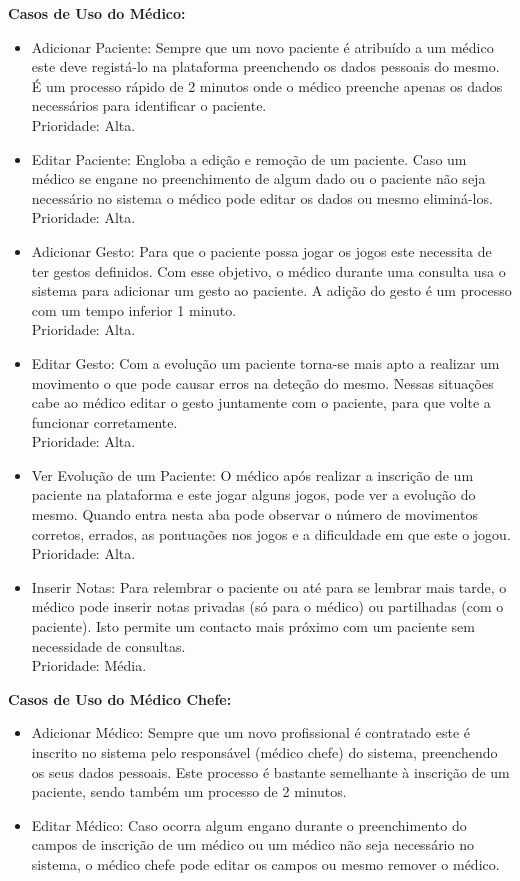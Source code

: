 \documentclass{TTUPhD}
\begin{document}
\textbf{Casos de Uso do Médico:}
\begin{itemize}
	\item Adicionar Paciente: Sempre que um novo paciente é atribuído a um médico este
		  deve registá-lo na plataforma preenchendo os dados pessoais do mesmo.
		  É um processo rápido de 2 minutos onde o médico preenche apenas os dados necessários para identificar o paciente.\\
          Prioridade: Alta.
	\item Editar Paciente: Engloba a edição e remoção de um paciente.
		  Caso um médico se engane no preenchimento de algum dado ou o paciente não seja necessário no sistema o médico pode editar os dados ou mesmo eliminá-los.\\
          Prioridade: Alta.
	\item Adicionar Gesto: Para que o paciente possa jogar os jogos este necessita de ter gestos definidos.
		  Com esse objetivo, o médico durante uma consulta usa o sistema para adicionar um gesto ao paciente.
		  A adição do gesto é um processo com um tempo inferior 1 minuto.\\
          Prioridade: Alta.
	\item Editar Gesto: Com a evolução um paciente torna-se mais apto a realizar um movimento o que pode causar erros na deteção do mesmo.
		  Nessas situações cabe ao médico editar o gesto juntamente com o paciente, para que volte a funcionar corretamente.\\
	      Prioridade: Alta.
	\item Ver Evolução de um Paciente: O médico após realizar a inscrição de um paciente na plataforma e este jogar alguns jogos,
		  pode ver a evolução do mesmo. Quando entra nesta aba pode observar o número de movimentos corretos, errados, as
		  pontuações nos jogos e a dificuldade em que este o jogou.\\
		  Prioridade: Alta.
	\item Inserir Notas: Para relembrar o paciente ou até para se lembrar mais tarde, o médico pode inserir notas privadas (só para o médico)
		  ou partilhadas (com o paciente). Isto permite um contacto mais próximo com um paciente sem necessidade de consultas.\\
		  Prioridade: Média.
\end{itemize}

\textbf{Casos de Uso do Médico Chefe:}
\begin{itemize}
	\item Adicionar Médico: Sempre que um novo profissional é contratado este é inscrito no sistema pelo responsável (médico chefe)
		  do sistema, preenchendo os seus dados pessoais. Este processo é bastante semelhante à inscrição de um paciente, sendo também um processo de 2 minutos.
	\item Editar Médico: Caso ocorra algum engano durante o preenchimento do campos de inscrição de um médico ou um médico
		  não seja necessário no sistema, o médico chefe pode editar os campos ou mesmo remover o médico.
\end{itemize}
\end{document}
